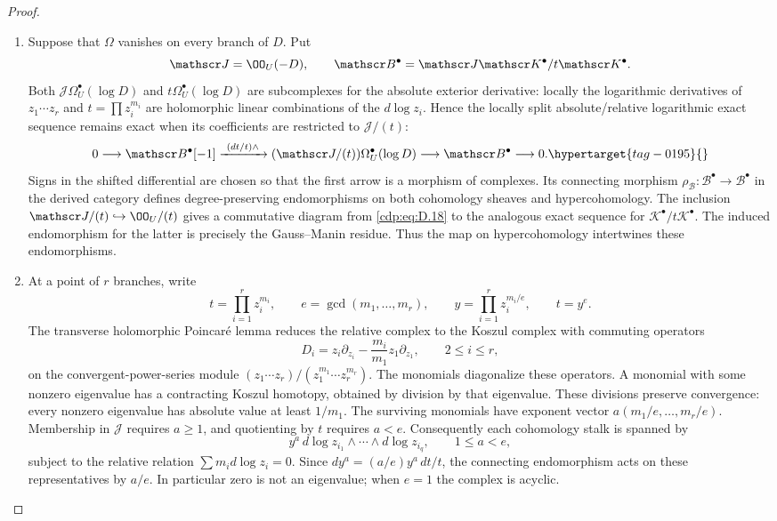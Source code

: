 \begin{proof}
\begin{enumerate}[leftmargin=*]
\item Suppose that $\Omega$ vanishes on every
branch of $D$. Put
\[
 \mathscr J=\OO_U(-D),\qquad
 \mathscr B^\bullet=
 \mathscr J\mathscr K^\bullet/t\mathscr K^\bullet.
\]
Both $\mathscr J\Omega_U^\bullet(\log D)$ and
$t\Omega_U^\bullet(\log D)$ are subcomplexes for the absolute
exterior derivative: locally the logarithmic derivatives of
$z_1\cdots z_r$ and $t=\prod z_i^{m_i}$ are holomorphic
linear combinations of the $d\log z_i$. Hence the locally split
absolute/relative logarithmic exact sequence remains exact
when its coefficients are restricted to $\mathscr J/(t)$:
\begin{equation}
0\longrightarrow\mathscr B^\bullet[-1]
 \xrightarrow{\ (dt/t)\wedge\ }
 (\mathscr J/(t))\Omega_U^\bullet(\log D)
 \longrightarrow\mathscr B^\bullet\longrightarrow0.
\hypertarget{tag-0195}{}\label{cdp:eq:D.18}
\end{equation}
Signs in the shifted differential are chosen so that the first
arrow is a morphism of complexes. Its connecting morphism
$\rho_{\mathscr B}:\mathscr B^\bullet\to\mathscr B^\bullet$
in the derived category defines degree-preserving endomorphisms
on both cohomology sheaves and hypercohomology. The inclusion
$\mathscr J/(t)\hookrightarrow\OO_U/(t)$ gives a commutative
diagram from \eqref{cdp:eq:D.18} to the analogous exact sequence for
$\mathscr K^\bullet/t\mathscr K^\bullet$. The induced
endomorphism for the latter is precisely the Gauss--Manin
residue. Thus the map on hypercohomology intertwines these
endomorphisms.

\item At a point of $r$ branches,
write
\[
 t=\prod_{i=1}^r z_i^{m_i},\qquad
 e=\gcd(m_1,\ldots,m_r),\qquad
 y=\prod_{i=1}^r z_i^{m_i/e},\qquad t=y^e.
\]
The transverse holomorphic Poincar\'e lemma reduces the relative
complex to the Koszul complex with commuting operators
\[
 D_i=z_i\partial_{z_i}
           -\frac{m_i}{m_1}z_1\partial_{z_1},
 \qquad 2\le i\le r,
\]
on the convergent-power-series module
$(z_1\cdots z_r)/(z_1^{m_1}\cdots z_r^{m_r})$.
The monomials diagonalize these operators. A monomial with some
nonzero eigenvalue has a contracting Koszul homotopy, obtained
by division by that eigenvalue. These divisions preserve
convergence: every nonzero eigenvalue has absolute value at
least $1/m_1$. The surviving monomials have exponent vector
$a(m_1/e,\ldots,m_r/e)$. Membership in $\mathscr J$ requires
$a\ge1$, and quotienting by $t$ requires $a<e$. Consequently
each cohomology stalk is spanned by
\[
 y^a\,d\log z_{i_1}\wedge\cdots\wedge d\log z_{i_q},
 \qquad 1\le a<e,
\]
subject to the relative relation $\sum m_i d\log z_i=0$.
Since $dy^a=(a/e)y^a\,dt/t$, the connecting endomorphism
acts on these representatives by $a/e$. In particular zero is
not an eigenvalue; when $e=1$ the complex is acyclic.


\end{enumerate}
\end{proof}
